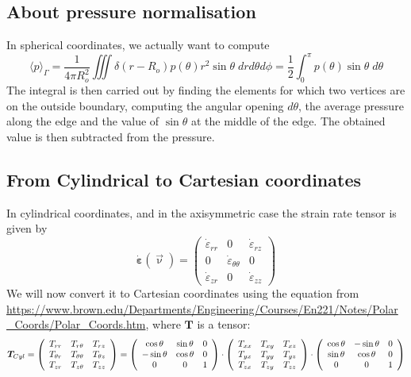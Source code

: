 \subsection*{About pressure normalisation}

In spherical coordinates, we actually want to compute 
\[
\langle p \rangle _\Gamma = 
\frac{1}{4\pi R_o^2} \iiint \delta(r-R_o) p(\theta) r^2 \sin\theta \; dr d\theta d\phi 
= \frac{1}{2} \int_0^\pi p(\theta) \sin\theta \; d\theta
\]
The integral is then carried out by finding the elements for which 
two vertices are on the outside boundary, 
computing the angular opening $d\theta$, the average pressure 
along the edge and the value of $\sin\theta$ at the
middle of the edge. 
The obtained value is then subtracted from the pressure. 

\subsection*{From Cylindrical to Cartesian coordinates}

In cylindrical coordinates, and in the axisymmetric case
the strain rate tensor is given by
\[
\dot{\bm\varepsilon}(\vec\upnu)
=
\left(
\begin{array}{ccc}
\dot\varepsilon_{rr} & 0 & \dot{\varepsilon}_{rz} \\
0 & \dot{\varepsilon}_{\theta\theta}  & 0 \\
\dot{\varepsilon}_{zr} & 0 & \dot\varepsilon_{zz}
\end{array}
\right)
\]
We will now convert it to Cartesian coordinates using the equation 
from \url{https://www.brown.edu/Departments/Engineering/Courses/En221/Notes/Polar_Coords/Polar_Coords.htm}, where ${\bm T}$ is a tensor:
\[
{\bm T}_{\tiny Cyl}=
\left(
\begin{array}{ccc}
T_{rr}       & T_{r\theta}      & T_{rz} \\
T_{\theta r} & T_{\theta\theta} & T_{\theta z} \\
T_{z r}      & T_{z \theta}     & T_{zz}
\end{array}
\right)
=
\left(
\begin{array}{ccc}
 \cos \theta&\sin \theta&0 \\
-\sin \theta&\cos \theta&0 \\
0 & 0 & 1 
\end{array}
\right)
\cdot
\left(
\begin{array}{ccc}
T_{xx} & T_{xy} & T_{xz} \\
T_{yx} & T_{yy} & T_{yz} \\
T_{zx} & T_{zy} & T_{zz} 
\end{array}
\right)
\cdot
\left(
\begin{array}{ccc}
\cos \theta & -\sin \theta&0 \\
\sin \theta &  \cos \theta&0 \\
0 & 0 & 1 
\end{array}
\right)
\]

